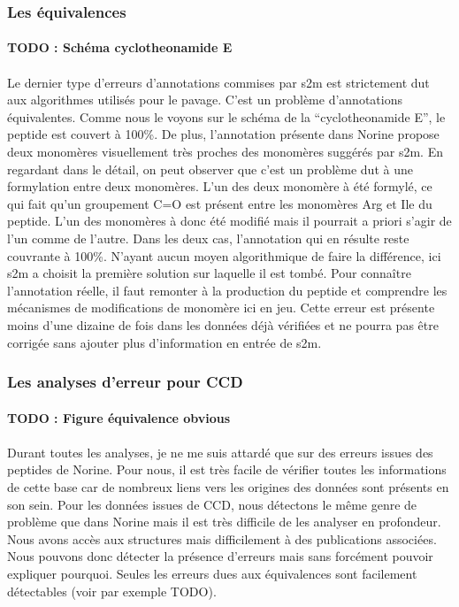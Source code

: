\documentclass[12pt,french,twoside]{report}
\begin{document}
\subsubsection{Les équivalences}

\paragraph{TODO : Schéma cyclotheonamide E}

\paragraph{}Le dernier type d'erreurs d'annotations commises par s2m est strictement dut aux algorithmes utilisés pour le pavage.
C'est un problème d'annotations équivalentes.
Comme nous le voyons sur le schéma de la ``cyclotheonamide E'', le peptide est couvert à 100\%.
De plus, l'annotation présente dans Norine propose deux monomères visuellement très proches des monomères suggérés par s2m.
En regardant dans le détail, on peut observer que c'est un problème dut à une formylation entre deux monomères.
L'un des deux monomère à été formylé, ce qui fait qu'un groupement C=O est présent entre les monomères Arg et Ile du peptide.
L'un des monomères à donc été modifié mais il pourrait a priori s'agir de l'un comme de l'autre.
Dans les deux cas, l'annotation qui en résulte reste couvrante à 100\%.
N'ayant aucun moyen algorithmique de faire la différence, ici s2m a choisit la première solution sur laquelle il est tombé.
Pour connaître l'annotation réelle, il faut remonter à la production du peptide et comprendre les mécanismes de modifications de monomère ici en jeu.
Cette erreur est présente moins d'une dizaine de fois dans les données déjà vérifiées et ne pourra pas être corrigée sans ajouter plus d'information en entrée de s2m.


\subsubsection{Les analyses d'erreur pour CCD}

\paragraph{TODO : Figure équivalence obvious}

\paragraph{}Durant toutes les analyses, je ne me suis attardé que sur des erreurs issues des peptides de Norine.
Pour nous, il est très facile de vérifier toutes les informations de cette base car de nombreux liens vers les origines des données sont présents en son sein.
Pour les données issues de CCD, nous détectons le même genre de problème que dans Norine mais il est très difficile de les analyser en profondeur.
Nous avons accès aux structures mais difficilement à des publications associées.
Nous pouvons donc détecter la présence d'erreurs mais sans forcément pouvoir expliquer pourquoi.
Seules les erreurs dues aux équivalences sont facilement détectables (voir par exemple TODO).
\end{document}
